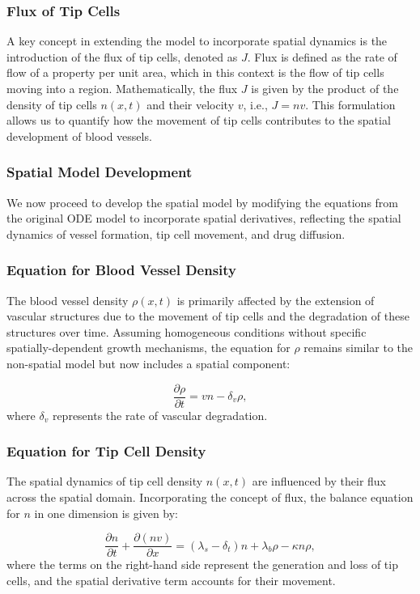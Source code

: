 \subsubsection{Flux of Tip Cells}
A key concept in extending the model to incorporate spatial dynamics is the introduction of the flux of tip cells, denoted as \(J\). Flux is defined as the rate of flow of a property per unit area, which in this context is the flow of tip cells moving into a region. Mathematically, the flux \(J\) is given by the product of the density of tip cells \(n(x,t)\) and their velocity \(v\), i.e., \(J = nv\). This formulation allows us to quantify how the movement of tip cells contributes to the spatial development of blood vessels.

\subsubsection{Spatial Model Development}
We now proceed to develop the spatial model by modifying the equations from the original ODE model to incorporate spatial derivatives, reflecting the spatial dynamics of vessel formation, tip cell movement, and drug diffusion.


\subsubsection{Equation for Blood Vessel Density}
The blood vessel density \(\rho(x,t)\) is primarily affected by the extension of vascular structures due to the movement of tip cells and the degradation of these structures over time. Assuming homogeneous conditions without specific spatially-dependent growth mechanisms, the equation for \(\rho\) remains similar to the non-spatial model but now includes a spatial component:

\begin{equation}
	\boxed{\frac{\partial \rho}{\partial t} = vn - \delta_v \rho},
\end{equation}
where \(\delta_v\) represents the rate of vascular degradation.

\subsubsection{Equation for Tip Cell Density}
The spatial dynamics of tip cell density \(n(x,t)\) are influenced by their flux across the spatial domain. Incorporating the concept of flux, the balance equation for \(n\) in one dimension is given by:

\begin{equation}
	\boxed{\frac{\partial n}{\partial t} + \frac{\partial (nv)}{\partial x} = (\lambda_s - \delta_t) n + \lambda_b \rho - \kappa n \rho},
\end{equation}
where the terms on the right-hand side represent the generation and loss of tip cells, and the spatial derivative term accounts for their movement.

